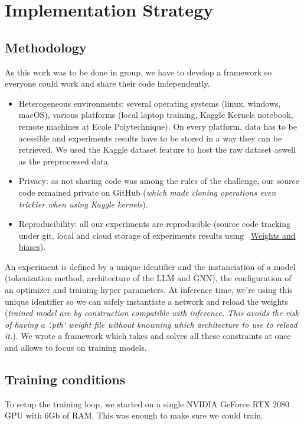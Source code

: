 \section{Implementation Strategy}
\label{sec:remplementation}
\subsection*{Methodology}
\label{sec:methodology}
As this work was to  be done in group, we have to develop a framework so everyone could work and share their code independently.
\begin{itemize}
    \item Heterogeneous environments: several operating systems (linux, windows, macOS), various platforms (local laptop training, Kaggle Kernels notebook, remote machines at Ecole Polytechnique). On every platform, data has to be acessible and experiments results have to be stored in a way they can be retrieved. We used the Kaggle dataset feature to  host the raw dataset aswell as the preprocessed data.
    \item Privacy: as not sharing code was among the rules of the challenge, our source code remained private on GitHub (\textit{which made cloning operations even trickier when using Kaggle kernels}).
    \item Reproducibility: all our experiments are reproducible (source code tracking under git, local and cloud storage of experiments results using ~\href{https://wandb.ai/molecule-nlp-altegrad-23/molecule-nlp}{Weights and biases}).
\end{itemize}
An experiment is defined by a unique identifier and the instanciation of a model (tokenization method, architecture of the LLM and GNN), the configuration of an  optimizer and training hyper parameters. At inference time, we're using this unique identifier so we can safely instantiate a network and reload the weights (\textit{trained model are by construction compatible with inference. This avoids the risk of having a `.pth` weight file without knowning which architecture to use to reload it.}).
We wrote a framework which takes and solves all these constraints at once and allows to focus on training models.


\subsection*{Training conditions}
\label{sec:training conditions}
To setup the training loop, we started on a single NVIDIA GeForce RTX 2080 GPU with 6Gb of RAM. This was enough to make sure we could train.


